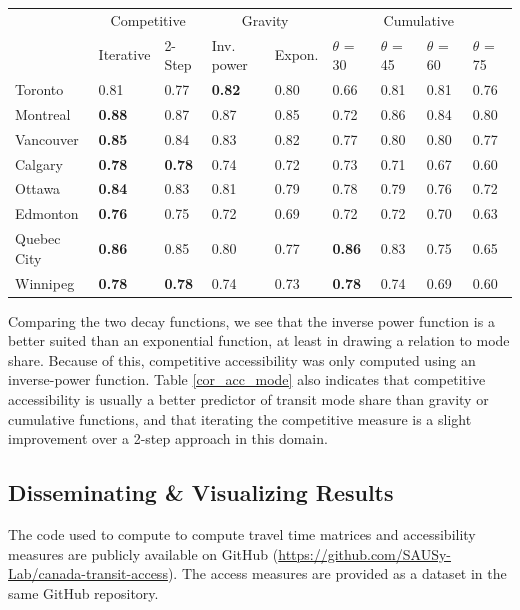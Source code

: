 \documentclass[11 pt, letterpaper]{article}
\begin{document}
{\begin{table}[H]
\begin{tabular}{@{}l|ll|ll|llll@{}}
		& 	\multicolumn{2}{c|}{Competitive}  & \multicolumn{2}{c|}{Gravity} & \multicolumn{4}{c}{Cumulative} \\
		& Iterative & 2-Step & Inv. power      & Expon.     & $\theta$ = 30     & $\theta$ = 45     & $\theta$ = 60    & $\theta$ = 75    \\ 
		\hline
		Toronto     & 0.81 & 0.77 & \textbf{0.82} & 0.80 & 0.66 & 0.81 & 0.81 & 0.76 \\
		Montreal    & \textbf{0.88} & 0.87 & 0.87 & 0.85 & 0.72 & 0.86 & 0.84 & 0.80 \\
		Vancouver   & \textbf{0.85} & 0.84 & 0.83 & 0.82 & 0.77 & 0.80 & 0.80 & 0.77 \\
		Calgary     & \textbf{0.78} & \textbf{0.78} & 0.74 & 0.72 & 0.73 & 0.71 & 0.67 & 0.60 \\
		Ottawa      & \textbf{0.84} & 0.83 & 0.81 & 0.79 & 0.78 & 0.79 & 0.76 & 0.72 \\
		Edmonton    & \textbf{0.76} & 0.75 & 0.72 & 0.69 & 0.72 & 0.72 & 0.70 & 0.63 \\
		Quebec City & \textbf{0.86} & 0.85 & 0.80 & 0.77 & \textbf{0.86} & 0.83 & 0.75 & 0.65 \\
		Winnipeg    & \textbf{0.78} & \textbf{0.78} & 0.74 & 0.73 & \textbf{0.78} & 0.74 & 0.69 & 0.60
	\end{tabular}
\end{table}

Comparing the two decay functions, we see that the inverse power function is a better suited than an exponential function, at least in drawing a relation to mode share. Because of this, competitive accessibility was only computed using an inverse-power function. Table \ref{cor_acc_mode} also indicates that competitive accessibility is usually a better predictor of transit mode share than gravity or cumulative functions, and that iterating the competitive measure is a slight improvement over a 2-step approach in this domain.






\subsection{Disseminating \& Visualizing Results}

The code used to compute to compute travel time matrices and accessibility measures are publicly available on GitHub (\url{https://github.com/SAUSy-Lab/canada-transit-access}). The access measures are provided as a dataset in the same GitHub repository.

}
\end{document}

